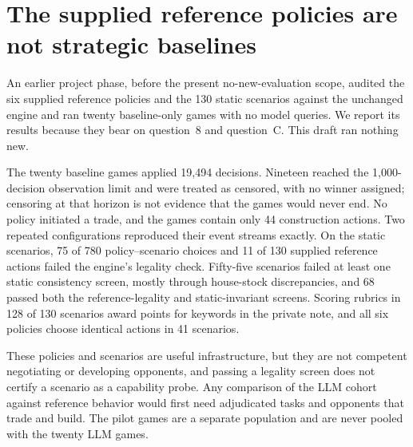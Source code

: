 \section{The supplied reference policies are not strategic baselines}
\label{app:pilot}

An earlier project phase, before the present no-new-evaluation scope, audited the six supplied reference policies and the 130 static scenarios against the unchanged engine and ran twenty baseline-only games with no model queries. We report its results because they bear on question~8 and question~C. This draft ran nothing new.

The twenty baseline games applied 19,494 decisions. Nineteen reached the 1,000-decision observation limit and were treated as censored, with no winner assigned; censoring at that horizon is not evidence that the games would never end. No policy initiated a trade, and the games contain only 44 construction actions. Two repeated configurations reproduced their event streams exactly. On the static scenarios, 75 of 780 policy--scenario choices and 11 of 130 supplied reference actions failed the engine's legality check. Fifty-five scenarios failed at least one static consistency screen, mostly through house-stock discrepancies, and 68 passed both the reference-legality and static-invariant screens. Scoring rubrics in 128 of 130 scenarios award points for keywords in the private note, and all six policies choose identical actions in 41 scenarios.

These policies and scenarios are useful infrastructure, but they are not competent negotiating or developing opponents, and passing a legality screen does not certify a scenario as a capability probe. Any comparison of the LLM cohort against reference behavior would first need adjudicated tasks and opponents that trade and build. The pilot games are a separate population and are never pooled with the twenty LLM games.
